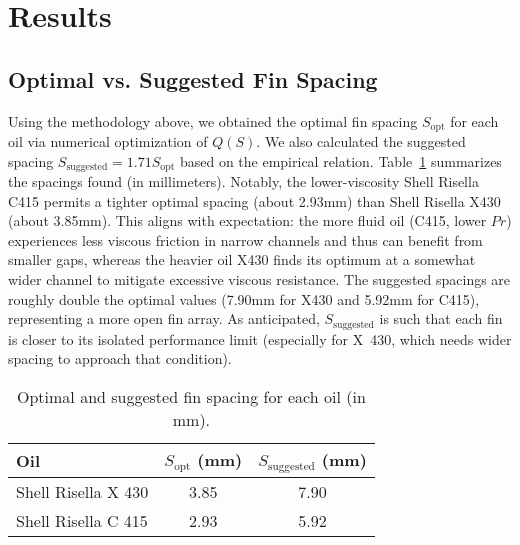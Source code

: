 \documentclass[12pt]{article}
\begin{document}
\section{Results}

\subsection{Optimal vs. Suggested Fin Spacing}
Using the methodology above, we obtained the optimal fin spacing $S_{\text{opt}}$ for each oil via numerical optimization of $Q(S)$. We also calculated the suggested spacing $S_{\text{suggested}} = 1.71 S_{\text{opt}}$ based on the empirical relation. Table~\ref{tab:spacing} summarizes the spacings found (in millimeters). Notably, the lower-viscosity Shell Risella C415 permits a tighter optimal spacing (about 2.93mm) than Shell Risella X430 (about 3.85mm). This aligns with expectation: the more fluid oil (C415, lower $Pr$) experiences less viscous friction in narrow channels and thus can benefit from smaller gaps, whereas the heavier oil X430 finds its optimum at a somewhat wider channel to mitigate excessive viscous resistance. The suggested spacings are roughly double the optimal values (7.90mm for X430 and 5.92mm for C415), representing a more open fin array. As anticipated, $S_{\text{suggested}}$ is such that each fin is closer to its isolated performance limit (especially for X~430, which needs wider spacing to approach that condition).

\begin{table}[h!]
\centering
\caption{Optimal and suggested fin spacing for each oil (in mm).}
\label{tab:spacing}
\begin{tabular}{lcc}
\toprule
Oil & $S_{\text{opt}}$ (mm) & $S_{\text{suggested}}$ (mm) \\
\midrule
Shell Risella X 430 & 3.85 & 7.90 \\
Shell Risella C 415 & 2.93 & 5.92 \\
\bottomrule
\end{tabular}
\end{table}
\end{document}
